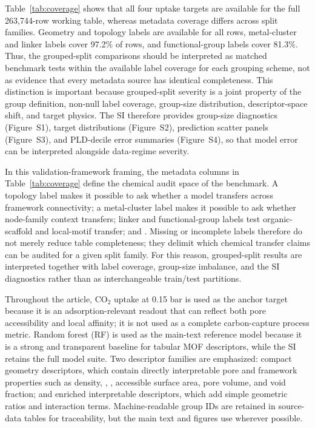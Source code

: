 \documentclass[11pt,a4paper]{article}
\newcommand{\del}[1]{}
\begin{document}
Table~\ref{tab:coverage} shows that all four uptake targets are available for the full 263,744-row working table, whereas metadata coverage differs across split families. Geometry and topology labels are available for all rows, metal-cluster and linker labels cover 97.2\% of rows, and functional-group labels cover 81.3\%. Thus, the grouped-split comparisons should be interpreted as matched benchmark tests within the available label coverage for each grouping scheme, not as evidence that every metadata source has identical completeness. This distinction is important because grouped-split severity is a joint property of the group definition, non-null label coverage, group-size distribution, descriptor-space shift, and target physics. The SI therefore provides group-size diagnostics (Figure~S1), target distributions (Figure~S2), prediction scatter panels (Figure~S3), and PLD-decile error summaries (Figure~S4), so that model error can be interpreted alongside data-regime severity.


In this validation-framework framing, the metadata columns in Table~\ref{tab:coverage} define the chemical audit space of the benchmark. A topology label makes it possible to ask whether a model transfers across framework connectivity; a metal-cluster label makes it possible to ask whether node-family context transfers; linker and functional-group labels test organic-scaffold and local-motif transfer; and \del{geometry labels test pore-regime transfer}. Missing or incomplete labels therefore do not merely reduce table completeness; they delimit which chemical transfer claims can be audited for a given split family. For this reason, grouped-split results are interpreted together with label coverage, group-size imbalance, and the SI diagnostics rather than as interchangeable train/test partitions.


Throughout the article, CO$_2$ uptake at 0.15 bar is used as the anchor target because it is an adsorption-relevant readout that can reflect both pore accessibility and local affinity; it is not used as a complete carbon-capture process metric. Random forest (RF) is used as the main-text reference model because it is a strong and transparent baseline for tabular MOF descriptors, while the SI retains the full model suite. Two descriptor families are emphasized: compact geometry descriptors, which contain directly interpretable pore and framework properties such as density, , , accessible surface area, pore volume, and void fraction; and enriched interpretable descriptors, which add simple geometric ratios and interaction terms. Machine-readable group IDs are retained in source-data tables for traceability, but the main text and figures use \del{chemistry-facing audit labels} wherever possible.
\end{document}
